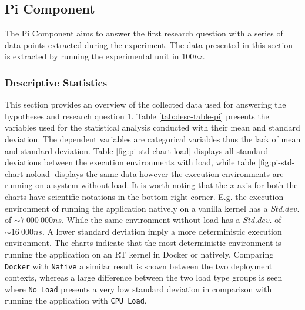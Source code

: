 \subsection{Pi Component}
\label{section:analysis-picomponent}

The Pi Component aims to answer the first research question with a series of data points extracted during the experiment. The data presented in this section is extracted by running the experimental unit in $100hz$.


\subsubsection{Descriptive Statistics}
\label{section:analysis-picomponent-desc}

This section provides an overview of the collected data used for answering the hypotheses and research question 1. Table \ref{tab:desc-table-pi} presents the variables used for the statistical analysis conducted with their mean and standard deviation. The dependent variables are categorical variables thus the lack of mean and standard deviation. Table \ref{fig:pi-std-chart-load} displays all standard deviations between the execution environments with load, while table \ref{fig:pi-std-chart-noload} displays the same data however the execution environments are running on a system without load. It is worth noting that the $x$ axis for both the charts have scientific notations in the bottom right corner. E.g. the execution environment of running the application natively on a vanilla kernel has a $Std. dev.$ of $\sim7\ 000\ 000ns$. While the same environment without load has a $Std. dev.$ of $\sim16\ 000ns$. A lower standard deviation imply a more deterministic execution environment. The charts indicate that the most deterministic environment is running the application on an RT kernel in Docker or natively. Comparing \texttt{Docker} with \texttt{Native} a similar result is shown between the two deployment contexts, whereas a large difference between the two load type groups is seen where \texttt{No Load} presents a very low standard deviation in comparison with running the application with \texttt{CPU Load}.


